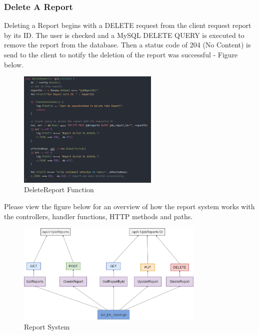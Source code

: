 \subsubsection{Delete A Report}
Deleting a Report begins with a DELETE request from the client request report by its ID. The user is checked and a MySQL DELETE QUERY is executed to remove the report from the database. Then a status code of 204 (No Content) is send to the client to notify the deletion of the report was successful - Figure below. 

\begin{figure}[H]
    \caption{DeleteReport Function}
    \label{image:deleteReport}
    \centering
    \includegraphics[width=0.6\textwidth]{images/horton/report_system/delete_report.png}
\end{figure}

Please view the figure below for an overview of how the report system works with the controllers, handler functions, HTTP methods and paths.
\begin{figure}[H]
    \caption{Report System}
    \label{image:reportSystem}
    \centering
    \includegraphics[width=0.8\textwidth]{images/horton/report_system/report_system.png}
\end{figure}

